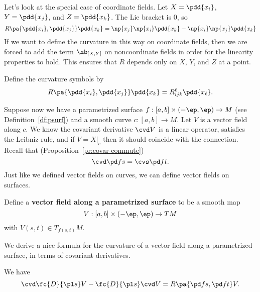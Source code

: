 Let's look at the special case of coordinate fields. Let $X=\pdd{x_i}$, $Y=\pdd{x_j}$, and $Z=\pdd{x_k}$. The Lie bracket is 0, so 
\[
R\pa{\pdd{x_i},\pdd{x_j}}\pdd{x_k}=\np{x_j}\np{x_i}\pdd{x_k}-\np{x_i}\np{x_j} \pdd{x_k}
\]
If we want to define the curvature in this way on coordinate fields, then we are forced to add the term $\nb_{[X,Y]}$ on noncoordinate fields in order for the linearity properties to hold. This ensures that $R$ depends only on $X$, $Y$, and $Z$ at a point.
\begin{df}
Define the curvature symbols by
\[
R\pa{\pdd{x_i},\pdd{x_j}}\pdd{x_k}=R_{ijk}^{\ell}\pdd{x_{\ell}}.
\]
\end{df}
Suppose now we have a parametrized surface $f:[a,b]\times (-\ep,\ep)\to M$ (see Definition~\ref{df:psurf}) and a smooth curve $c:[a,b]\to M$. Let $V$ is a vector field along $c$. We know the covariant derivative $\cvd V$ is a linear operator, satisfies the Leibniz rule, and if $V=X|_c$ then it should coincide with the connection. Recall that (Proposition~\ref{pr:covar-commute})
\[
\cvd \pd fs=\cvs \pd ft.
\]
Just like we defined vector fields on curves, we can define vector fields on surfaces.
\begin{df}
Define a \textbf{vector field along a parametrized surface} to be a smooth map
\[
V:[a,b]\times (-\ep,\ep)\to TM
\]
with $V(s,t)\in T_{f(s,t)}M$.
\end{df}
We derive a nice formula for the curvature of a vector field along a parametrized surface, in terms of covariant derivatives.
\begin{lem}
We have
\[
\cvd \fc{D}{\pl s} V-\fc{D}{\pl s}\cvd V=R\pa{\pd fs,\pd ft}V.
\]
\end{lem}

